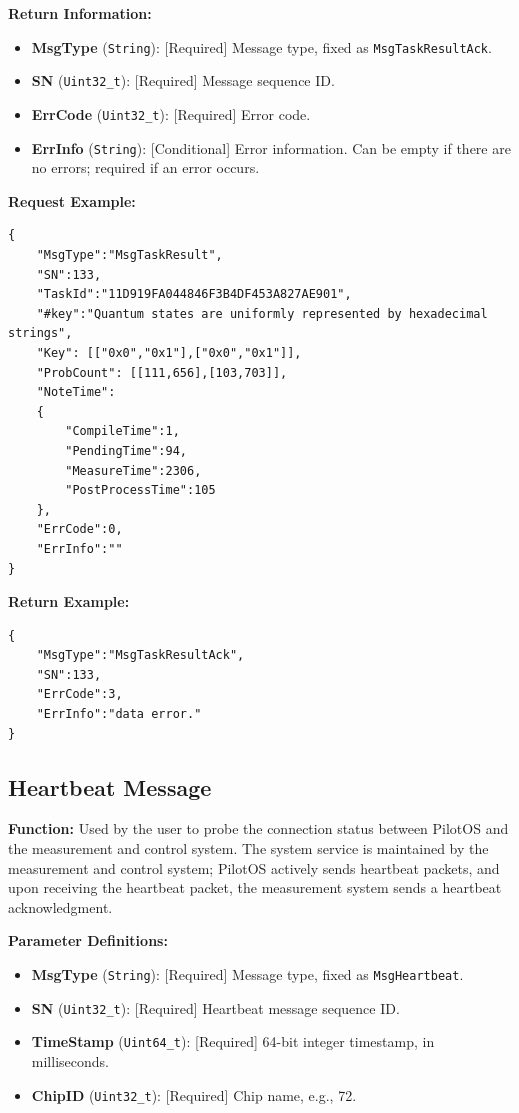 \documentclass[12pt, a4paper]{article}
\begin{document}
\textbf{Return Information:}
\begin{itemize}
    \item \textbf{MsgType} (\texttt{String}): [Required] Message type, fixed as \texttt{MsgTaskResultAck}.
    \item \textbf{SN} (\texttt{Uint32\_t}): [Required] Message sequence ID.
    \item \textbf{ErrCode} (\texttt{Uint32\_t}): [Required] Error code.
    \item \textbf{ErrInfo} (\texttt{String}): [Conditional] Error information. Can be empty if there are no errors; required if an error occurs.
\end{itemize}

\noindent \textbf{Request Example:}
\begin{lstlisting}
{
    "MsgType":"MsgTaskResult",
    "SN":133,
    "TaskId":"11D919FA044846F3B4DF453A827AE901",
    "#key":"Quantum states are uniformly represented by hexadecimal strings",
    "Key": [["0x0","0x1"],["0x0","0x1"]],
    "ProbCount": [[111,656],[103,703]],
    "NoteTime":
    {
        "CompileTime":1,
        "PendingTime":94,
        "MeasureTime":2306,
        "PostProcessTime":105
    },
    "ErrCode":0,
    "ErrInfo":""
}
\end{lstlisting}

\noindent \textbf{Return Example:}
\begin{lstlisting}
{
    "MsgType":"MsgTaskResultAck",
    "SN":133,
    "ErrCode":3,
    "ErrInfo":"data error."
}
\end{lstlisting}

\subsection{Heartbeat Message}

\textbf{Function:} Used by the user to probe the connection status between PilotOS and the measurement and control system. The system service is maintained by the measurement and control system; PilotOS actively sends heartbeat packets, and upon receiving the heartbeat packet, the measurement system sends a heartbeat acknowledgment.

\textbf{Parameter Definitions:}
\begin{itemize}
    \item \textbf{MsgType} (\texttt{String}): [Required] Message type, fixed as \texttt{MsgHeartbeat}.
    \item \textbf{SN} (\texttt{Uint32\_t}): [Required] Heartbeat message sequence ID.
    \item \textbf{TimeStamp} (\texttt{Uint64\_t}): [Required] 64-bit integer timestamp, in milliseconds.
    \item \textbf{ChipID} (\texttt{Uint32\_t}): [Required] Chip name, e.g., 72.
\end{itemize}
\end{document}
